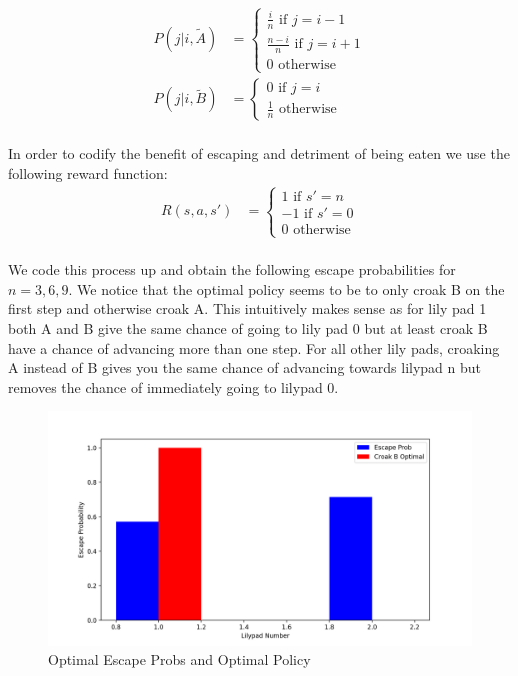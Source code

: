 \documentclass{article}[12pt]
\begin{document}
\begin{align*}
P(j | i, \tilde{A}) &=  \begin{cases} \frac{i}{n} \text{ if $j=i-1$}\\ \frac{n-i}{n} \text{ if $j=i+1$} \\ 0 \text{  otherwise} \end{cases}\\
P(j | i, \tilde{B}) &=  \begin{cases} 0 \text{ if $j=i$}\\ \frac{1}{n} \text{  otherwise} \end{cases}\\
\end{align*} 

In order to codify the benefit of escaping and detriment of being eaten we use the following reward function:
\begin{align*}
R(s,a,s') &=  \begin{cases} 1 \text{ if $s'=n$}\\ -1 \text{ if $s'=0$} \\ 0 \text{  otherwise} \end{cases}\\
\end{align*} 

We code this process up and obtain the following escape probabilities for $ n = 3,6,9$. We notice that the optimal policy seems to be to only croak B on the first step and otherwise croak A. This intuitively makes sense as for lily pad 1 both A and B give the same chance of going to lily pad 0 but at least croak B have a chance of advancing more than one step. For all other lily pads, croaking A instead of B gives you the same chance of advancing towards lilypad n but removes the chance of immediately going to lilypad 0.

\begin{figure}
  \includegraphics[width=\linewidth]{llp_3.png}
  \caption{Optimal Escape Probs and Optimal Policy}
  \label{fig:llp3}
\end{figure}
\end{document}
